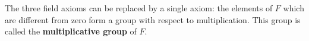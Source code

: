 The three field axioms can be replaced by a single axiom: the elements of $F$ which are different from zero form a group with respect to multiplication. This group is called the \textbf{multiplicative group} of $F$.
